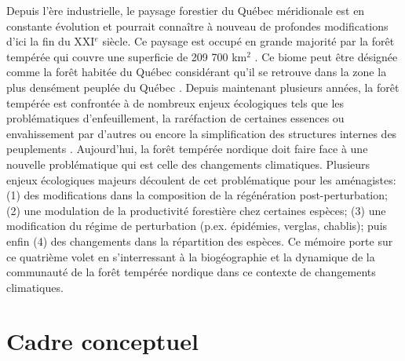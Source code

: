 
Depuis l'ère industrielle, le paysage forestier du Québec méridionale est en constante évolution
\citep{Dupuis2011,Boucher2006} et pourrait connaître à nouveau de profondes modifications d'ici la
fin du XXI$^e$ siècle. Ce paysage est occupé en grande majorité par la forêt tempérée qui couvre une
superficie de 209 700 km$^2$ \citep{Boulay2015}. Ce biome peut être désignée comme la forêt habitée
du Québec considérant qu'il se retrouve dans la zone la plus densément peuplée du Québec
\citep{Doyon2009}. Depuis maintenant plusieurs années, la forêt tempérée est confrontée à de
nombreux enjeux écologiques tels que les problématiques d'enfeuillement, la raréfaction de certaines
essences ou envahissement par d’autres ou encore la simplification des structures internes des
peuplements \citep{Varady-Szabo2008}. Aujourd'hui, la forêt tempérée nordique doit faire face à une
nouvelle problématique qui est celle des changements climatiques. Plusieurs enjeux écologiques
majeurs découlent de cet problématique pour les aménagistes: (1) des modifications dans la
composition de la régénération post-perturbation; (2) une modulation de la productivité forestière
chez certaines espèces; (3) une modification du régime de perturbation (p.ex. épidémies, verglas,
chablis); puis enfin (4) des changements dans la répartition des espèces. Ce mémoire porte sur ce
quatrième volet en s'interressant à la biogéographie et la dynamique de la communauté de la forêt
tempérée nordique dans ce contexte de changements climatiques.

\section*{Cadre conceptuel}

